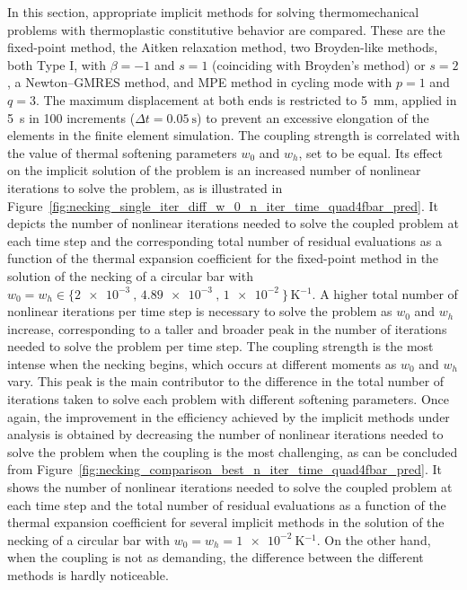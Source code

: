      In this section, appropriate implicit methods for solving thermomechanical problems with thermoplastic constitutive behavior are compared.
     These are the fixed-point method, the Aitken relaxation method, two Broyden-like methods, both Type I, with $\beta=-1$ and $s=1$ (coinciding with Broyden's method) or $s=2$, a Newton–GMRES method, and MPE method in cycling mode with $p=1$ and $q=3$.
     The maximum displacement at both ends is restricted to \SI{5}{\milli\meter}, applied in \SI{5}{\second} in 100 increments (\(\Delta t = \SI{0.05}{\second}\)) to prevent an excessive elongation of the elements in the finite element simulation.
     The coupling strength is correlated with the value of thermal softening parameters \(w_0\) and \(w_h\), set to be equal.
     Its effect on the implicit solution of the problem is an increased number of nonlinear iterations to solve the problem, as is illustrated in Figure~\ref{fig:necking_single_iter_diff_w_0_n_iter_time_quad4fbar_pred}.
     It depicts the number of nonlinear iterations needed to solve the coupled problem at each time step and the corresponding total number of residual evaluations as a function of the thermal expansion coefficient for the fixed-point method in the solution of the necking of a circular bar with \(w_0=w_h\in\{\SI{2e-3}{},\, \SI{4.89e-3}{},\, \SI{1e-2}{}\}\,\si{\kelvin^{-1}}\).
     A higher total number of nonlinear iterations per time step is necessary to solve the problem as \(w_0\) and \(w_h\) increase, corresponding to a taller and broader peak in the number of iterations needed to solve the problem per time step.
     The coupling strength is the most intense when the necking begins, which occurs at different moments as \(w_0\) and \(w_h\) vary.
     This peak is the main contributor to the difference in the total number of iterations taken to solve each problem with different softening parameters.
     Once again, the improvement in the efficiency achieved by the implicit methods under analysis is obtained by decreasing the number of nonlinear iterations needed to solve the problem when the coupling is the most challenging, as can be concluded from Figure~\ref{fig:necking_comparison_best_n_iter_time_quad4fbar_pred}.
     It shows the number of nonlinear iterations needed to solve the coupled problem at each time step and the total number of residual evaluations as a function of the thermal expansion coefficient for several implicit methods in the solution of the necking of a circular bar with \(w_0=w_h=\SI{1e-2}{\kelvin^{-1}}\).
     On the other hand, when the coupling is not as demanding, the difference between the different methods is hardly noticeable.

